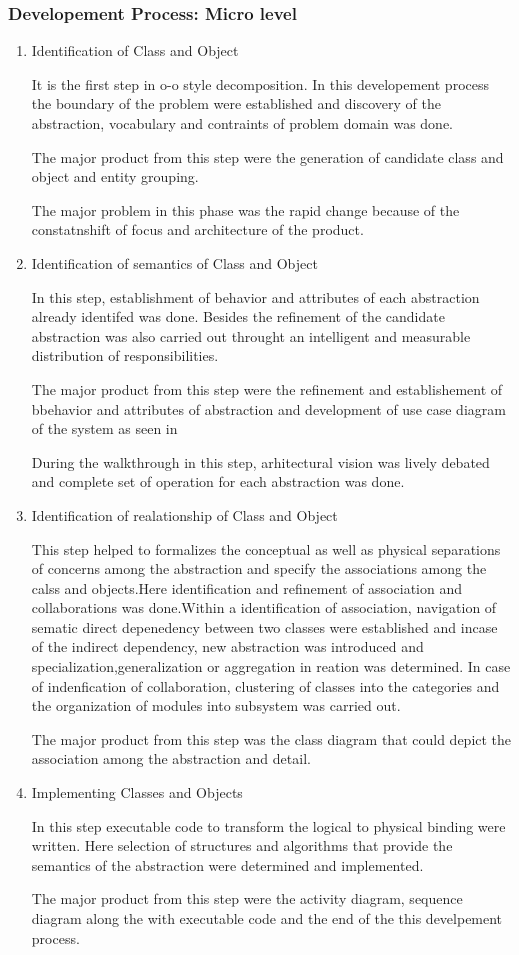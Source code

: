 \documentclass[a4paper,12pt,onepage]{article}
\begin{document}
\subsubsection{Developement Process: Micro level}
\begin{enumerate}
\item Identification of Class and Object
\par
It is the first step in o-o style decomposition. In this developement process the boundary of the problem were established and discovery of the abstraction, vocabulary and contraints of problem domain was done.
\par
The major product from this step were the generation of candidate class and object and entity grouping.
\par 
The major problem in this phase was the rapid change because of the constatnshift of focus and architecture of the product.
\newpage
\item Identification of semantics of Class and Object
\par
In this step, establishment of behavior and attributes of each abstraction already identifed was done. Besides the refinement of the candidate abstraction was also carried out throught an intelligent and measurable distribution of responsibilities.
\par
The major product from this step were the refinement and establishement of bbehavior and attributes of abstraction and development of use case diagram of the system as seen in 
\par
During the walkthrough in this step, arhitectural vision was lively debated and complete set of operation for each abstraction was done.
\newpage
\item Identification of realationship of Class and Object
\par
This step helped to formalizes the conceptual as well as physical separations of concerns among the abstraction and specify the associations among the calss and objects.Here identification and refinement of association and collaborations was done.Within a identification of association, navigation of sematic direct depenedency between two classes were established and incase of the indirect dependency, new abstraction was introduced and specialization,generalization or aggregation in reation was determined. In case of indenfication of collaboration, clustering of classes into the categories and the organization of modules into subsystem was carried out.

\par
The major product from this step was the class diagram that could depict the association among the abstraction and detail.
\newpage
\item Implementing Classes and Objects
\par
In this step executable code to transform the logical to physical binding were written. Here selection of structures and algorithms that provide the semantics of the abstraction were determined and implemented.

\par 
The major product from this step were the activity diagram, sequence diagram along the with executable code and the end of the this develpement process.
\newpage
\end{enumerate}
\end{document}
